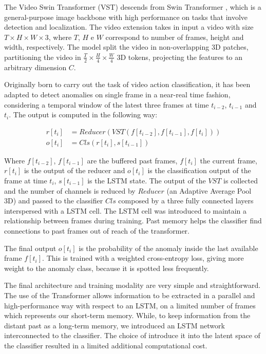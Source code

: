 The Video Swin Transformer (VST) descends from Swin Transformer \cite{liu2021Swin}, which is a general-purpose image backbone with high performance on tasks that involve detection and localization.
The video extension takes in input a video with size $T \times H \times W \times 3$, where $T$, $H$ e $W$ correspond to number of frames, height and width, respectively.
The model split the video in non-overlapping 3D patches, partitioning the video in $\frac{T}{2} \times \frac{H}{4} \times \frac{W}{4}$ 3D tokens, projecting the features to an arbitrary dimension $C$.

Originally born to carry out the task of video action classification, it has been adapted to detect anomalies on single frame in a near-real time fashion, considering a temporal window of the latest three frames at time $t_{i-2}$, $t_{i-1}$ and $t_{i}$.
The output is computed in the following way:

\begin{equation}
\begin{split}
    r[t_{i}] &= Reducer(VST(f[t_{i-2}], f[t_{i-1}], f[t_{i}])) \\
    o[t_{i}] &= Cls(r[t_{i}], s[t_{i-1}])
\end{split}
\end{equation}

\noindent Where $f[t_{i-2}]$, $f[t_{i-1}]$ are the buffered past frames, $f[t_{i}]$ the current frame, $r[t_{i}]$ is the output of the reducer and $o[t_{i}]$ is the classification output of the frame at time $t_{i}$, $s[t_{i-1}]$ is the LSTM state.
The output of the $VST$ is collected and the number of channels is reduced by $Reducer$ (an Adaptive Average Pool 3D) and passed to the classifier $Cls$ composed by a three fully connected layers interspersed with a LSTM cell.
The LSTM cell was introduced to maintain a relationship between frames during training.
Past memory helps the classifier find connections to past frames out of reach of the transformer.

The final output $o[t_{i}]$ is the probability of the anomaly inside the last available frame $f[t_{i}]$.
This is trained with a weighted cross-entropy loss, giving more weight to the anomaly class, because it is spotted less frequently.

The final architecture and training modality are very simple and straightforward.
The use of the Transformer allows information to be extracted in a parallel and high-performance way with respect to an LSTM, on a limited number of frames which represents our short-term memory.
While, to keep information from the distant past as a long-term memory, we introduced an LSTM network interconnected to the classifier.
The choice of introduce it into the latent space of the classifier resulted in a limited additional computational cost.

